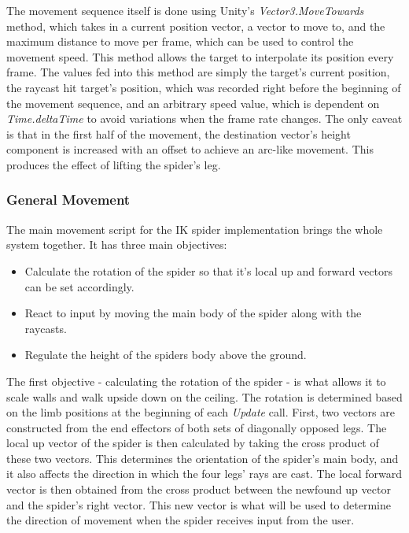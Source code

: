The movement sequence itself is done using Unity's \textit{Vector3.MoveTowards}
method, which takes in a current position vector, a vector to move to, and the
maximum distance to move per frame, which can be used to control the movement
speed. This method allows the target to interpolate its position every frame.
The values fed into this method are simply the target's current position, the
raycast hit target's position, which was recorded right before the beginning of
the movement sequence, and an arbitrary speed value, which is dependent on
\textit{Time.deltaTime} to avoid variations when the frame rate changes. The
only caveat is that in the first half of the movement, the destination vector's
height component is increased with an offset to achieve an arc-like movement.
This produces the effect of lifting the spider's leg.

\subsubsection{General Movement}
The main movement script for the IK spider implementation brings the whole
system together. It has three main objectives:

\begin{itemize}

    \item Calculate the rotation of the spider so that it's local up and forward
        vectors can be set accordingly.

    \item React to input by moving the main body of the spider along with the
        raycasts.

    \item Regulate the height of the spiders body above the ground.

\end{itemize}

The first objective - calculating the rotation of the spider - is what allows it
to scale walls and walk upside down on the ceiling. The rotation is determined
based on the limb positions at the beginning of each \textit{Update} call.
First, two vectors are constructed from the end effectors of both sets of
diagonally opposed legs. The local up vector of the spider is then calculated by
taking the cross product of these two vectors. This determines the orientation
of the spider's main body, and it also affects the direction in which the four legs'
rays are cast. The local forward vector is then obtained from the cross product
between the newfound up vector and the spider's right vector. This new vector is
what will be used to determine the direction of movement when the spider
receives input from the user.

